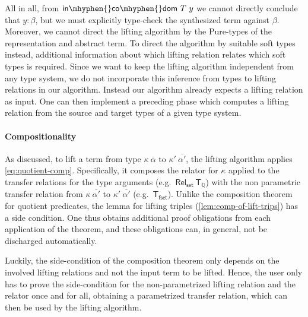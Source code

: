 \documentclass{article}
\theoremstyle{definition}
\newcommand{\incodom}{\mathsf{in\mhyphen{}co\mhyphen{}dom}}
\newcommand{\bool}{\mathsf{Bool}}
\newcommand{\rat}{\mathbb{Q}}
\newcommand{\liftrel}{lifting relation\xspace}
\newcommand{\liftrels}{lifting relations\xspace}
\begin{document}
All in all,
from $\incodom\ T\ y$ we cannot directly conclude that $y : \beta$,
but we must explicitly type-check the synthesized term against $\beta$.
Moreover, we cannot direct the lifting algorithm by
the Pure-types of the representation and abstract term.
To direct the algorithm by suitable soft types instead,
additional information about which lifting relation relates which soft types is required.
Since we want to keep the lifting algorithm independent from any type system,
we do not incorporate this inference from types to lifting relations in our algorithm.
Instead our algorithm already expects a lifting relation as input.
One can then implement a preceding phase
which computes a lifting relation from the source and target types of a given type system.

\paragraph{Compositionality}
As discussed,
to lift a term from type \(\kappa\ \overline{\alpha}\) to \(\kappa'\ \overline{\alpha'}\),
the lifting algorithm applies \cref{eq:quotient-comp}.
Specifically, it composes the relator for \(\kappa\) applied to the transfer relations for the type arguments (e.g.\ \(\mathsf{Rel_{set}}\ \mathsf{T_\rat}\))
with the non parametric transfer relation from \(\kappa\ \overline{\alpha'}\) to \(\kappa'\ \overline{\alpha'}\) (e.g.~\(\mathsf{T_{fset}}\)).
Unlike the composition theorem for quotient predicates,
the lemma for lifting triples (\cref{lem:comp-of-lift-trips})
has a side condition.
One thus obtains additional proof obligations from each application of the theorem,
and these obligations can, in general, not be discharged automatically.

Luckily, the side-condition of the composition theorem only depends on the involved \liftrels and not the input term to be lifted.
Hence, the user only has to prove the side-condition for the non-parametrized \liftrel
and the relator once and for all,
obtaining a parametrized transfer relation,
which can then be used by the lifting algorithm.
\newline
\end{document}
